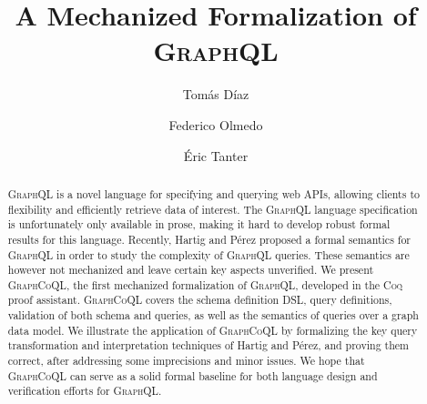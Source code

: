 \documentclass[sigplan,10pt,anonymous,review,nonacm]{acmart}
\newcommand{\plstyle}[1]{\mbox{\textsc{#1}}\xspace}
\newcommand{\gql}{\plstyle{GraphQL}}
\newcommand{\gcoql}{\plstyle{GraphCoQL}}
\newcommand{\coq}{\plstyle{Coq}}
\begin{document}
\title{A Mechanized Formalization of \gql}
\author{Tomás Díaz}

\author{Federico Olmedo}
\author{Éric Tanter}

\begin{abstract}
\gql is a novel language for specifying and querying web APIs, allowing clients to flexibility and efficiently retrieve data of interest. The \gql language specification is unfortunately only available in prose, making it hard to develop robust formal results for this language. Recently, Hartig and Pérez proposed a formal semantics for \gql in order to study the complexity of \gql queries. These semantics are however not mechanized and leave certain key aspects unverified. We present \gcoql, the first mechanized formalization of \gql, developed in the \coq proof assistant.  \gcoql covers the schema definition DSL, query definitions, validation of both schema and queries, as well as the semantics of queries over a graph data model.
We illustrate the application of \gcoql by formalizing the key query transformation and interpretation techniques of Hartig and Pérez, and proving them correct, after addressing some imprecisions and minor issues. 
We hope that \gcoql can serve as a solid formal baseline for both language design and verification efforts for \gql.
\end{abstract}


\maketitle







% 
% 



\clearpage


\end{document}
